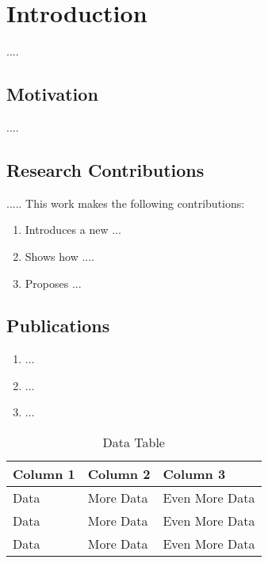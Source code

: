 \newpage 
\chapter{Introduction} 
\label{chapter:introduction}

....


\section{Motivation}
....


\section{Research Contributions}
..... This work makes the following contributions:

\begin{enumerate}[label={\arabic*.}]
    \item Introduces a new ...
    
    \item Shows how ....
    
    \item Proposes ... 

\end{enumerate}


\section{Publications}

\begin{enumerate}[label={\arabic*.}]
    \item ...
    
    \item ...
    
    \item ...

\end{enumerate}


\begin{table}[h]
    \centering
    \begin{tabular}{|l|l|l|}
        \hline
        \textbf{Column 1} & \textbf{Column 2} & \textbf{Column 3} \\ \hline
            Data & More Data & Even More Data \\ \hline
            Data & More Data & Even More Data \\ \hline
            Data & More Data & Even More Data \\ \hline
    \end{tabular}
    \caption{Data Table}
    \label{table:data_table}
\end{table}

